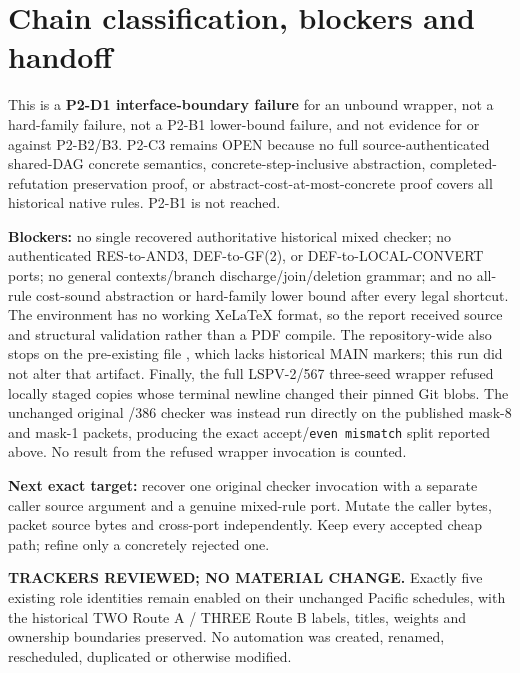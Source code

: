 \documentclass[11pt]{article}
\begin{document}
\section{Chain classification, blockers and handoff}
This is a \textbf{P2-D1 interface-boundary failure} for an unbound wrapper,
not a hard-family failure, not a P2-B1 lower-bound failure, and not evidence
for or against P2-B2/B3.  P2-C3 remains OPEN because no full source-authenticated
shared-DAG concrete semantics, concrete-step-inclusive abstraction,
completed-refutation preservation proof, or abstract-cost-at-most-concrete
proof covers all historical native rules.  P2-B1 is not reached.

\textbf{Blockers:} no single recovered authoritative historical mixed checker;
no authenticated RES-to-AND3, DEF-to-GF(2), or DEF-to-LOCAL-CONVERT ports;
no general contexts/branch discharge/join/deletion grammar; and no all-rule
cost-sound abstraction or hard-family lower bound after every legal shortcut.
The environment has no working XeLaTeX format, so the report received source
and structural validation rather than a PDF compile.  The repository-wide
 also stops on the pre-existing file
,
which lacks historical MAIN markers; this run did not alter that artifact.
Finally, the full LSPV-2/567 three-seed wrapper refused locally staged copies
whose terminal newline changed their pinned Git blobs.  The unchanged original
/386 checker was instead run directly on the published mask-8 and mask-1
packets, producing the exact accept/\texttt{even mismatch} split reported
above.  No result from the refused wrapper invocation is counted.

\textbf{Next exact target:} recover one original checker invocation with a
separate caller source argument and a genuine mixed-rule port.  Mutate the
caller bytes, packet source bytes and cross-port independently.  Keep every
accepted cheap path; refine only a concretely rejected one.

\textbf{TRACKERS REVIEWED; NO MATERIAL CHANGE.}  Exactly five existing role
identities remain enabled on their unchanged Pacific schedules, with the
historical TWO Route A / THREE Route B labels, titles, weights and ownership
boundaries preserved.  No automation was created, renamed, rescheduled,
duplicated or otherwise modified.
\end{document}
